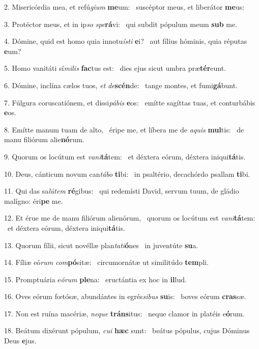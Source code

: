 2. Misericórdia mea, et refú\textit{gi}\textit{um} \textbf{me}um: \ast\  suscéptor meus, et liberátor \textbf{me}us:\

3. Protéctor meus, et in ip\textit{so} \textit{spe}\textbf{rá}vi: \ast\  qui subdit pópulum meum \textbf{sub} me.\

4. Dómine, quid est homo quia innotu\textit{ís}\textit{ti} \textbf{e}i? \ast\  aut fílius hóminis, quia réputas \textbf{e}um?\

5. Homo vanitáti sí\textit{mi}\textit{lis} \textbf{fac}tus est: \ast\  dies ejus sicut umbra præ\textbf{tér}eunt.\

6. Dómine, inclína cælos tuos, \textit{et} \textit{de}\textbf{scén}de: \ast\  tange montes, et fumi\textbf{gá}bunt.\

7. Fúlgura coruscatiónem, et dissi\textit{pá}\textit{bis} \textbf{e}os: \ast\  emítte sagíttas tuas, et conturbábis \textbf{e}os.\

8. Emítte manum tuam de alto, \dag\  éripe me, et líbera me de \textit{a}\textit{quis} \textbf{mul}tis: \ast\  de manu filiórum alie\textbf{nó}rum.\

9. Quorum os locútum est \textit{va}\textit{ni}\textbf{tá}tem: \ast\  et déxtera eórum, déxtera iniqui\textbf{tá}tis.\

10. Deus, cánticum novum can\textit{tá}\textit{bo} \textbf{ti}bi: \ast\  in psaltério, decachórdo psallam \textbf{ti}bi.\

11. Qui das sa\textit{lú}\textit{tem} \textbf{ré}gibus: \ast\  qui redemísti David, servum tuum, de gládio malígno: éri\textbf{pe} me.\

12. Et érue me de manu filiórum alienórum, \dag\  quorum os locútum est \textit{va}\textit{ni}\textbf{tá}tem: \ast\  et déxtera eórum, déxtera iniqui\textbf{tá}tis.\

13. Quorum fílii, sicut novéllæ plan\textit{ta}\textit{ti}\textbf{ó}nes \ast\  in juventúte \textbf{su}a.\

14. Fíliæ eó\textit{rum} \textit{com}\textbf{pó}sitæ: \ast\  circumornátæ ut similitúdo \textbf{tem}pli.\

15. Promptuária e\textit{ó}\textit{rum} \textbf{ple}na: \ast\  eructántia ex hoc in \textbf{il}lud.\

16. Oves eórum fœtósæ, abundántes in egrés\textit{si}\textit{bus} \textbf{su}is: \ast\  boves eórum \textbf{cras}sæ.\

17. Non est ruína macériæ, \textit{ne}\textit{que} \textbf{tráns}itus: \ast\  neque clamor in platéis e\textbf{ó}rum.\

18. Beátum dixérunt pópulum, \textit{cu}\textit{i} \textbf{hæc} sunt: \ast\  beátus pópulus, cujus Dóminus Deus \textbf{e}jus.\

